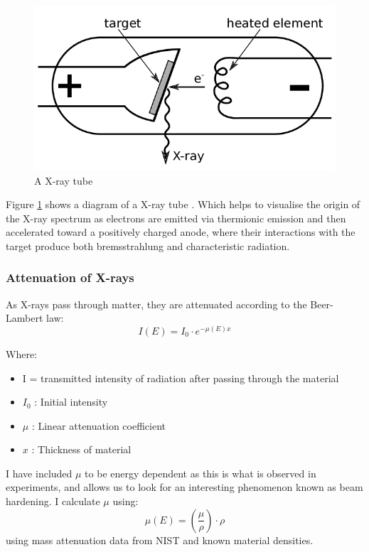 \documentclass{article}
\begin{document}
\begin{figure}
  \includegraphics[width=\linewidth]{xray_tube.png}
  \caption{A X-ray tube}
  \label{fig:X-ray tube}
\end{figure}
Figure \ref{fig:X-ray tube} \cite{Mason} shows a diagram of a X-ray tube . Which helps to visualise the origin of the X-ray spectrum as electrons are emitted via thermionic emission and then accelerated toward a positively charged anode, where their interactions with the target produce both bremsstrahlung and characteristic radiation.

\subsubsection{Attenuation of X-rays}
As X-rays pass through matter, they are attenuated according to the Beer-Lambert law: 
\begin{equation} \label{bl}
I(E) = I_0 \cdot e^{-\mu(E) x}
\end{equation}

Where:
\begin{itemize}
  \item I = transmitted intensity of radiation after passing through the material
  \item $I_0$ : Initial intensity
  \item $\mu$ : Linear attenuation coefficient
  \item $x$ : Thickness of material
\end{itemize}

I have included  $\mu$ to be energy dependent as this is what is observed in experiments, and allows us to look for an interesting phenomenon known as beam hardening. I calculate $\mu$ using:
\begin{equation} \label{linearatt}
\mu(E) = \left(\frac{\mu}{\rho}\right) \cdot \rho
\end{equation}
using mass attenuation data from NIST and known material densities.
\end{document}
